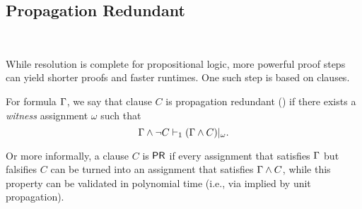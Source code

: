 
\subsection{Propagation Redundant}~\label{subsec:pr}

While resolution is complete for propositional logic, more powerful proof steps
can yield shorter proofs and faster runtimes. One such step is based on \pr
clauses.

\begin{definition}
    For formula $\Gamma$, we say that clause $C$ is propagation redundant
    (\pr) if there exists a \emph{witness} assignment $\omega$ such that
$$
    \Gamma \land \lnot C \vdash_1 (\Gamma \land C)|_\omega.
$$
\end{definition}


   Or more informally, a clause $C$ is $\textsf{PR}$ if every assignment that 
   satisfies $\Gamma$ but falsifies $C$ can be turned into an assignment
   that satisfies $\Gamma \land C$, while this property can be validated 
   in polynomial time (i.e., via implied by unit propagation).  






